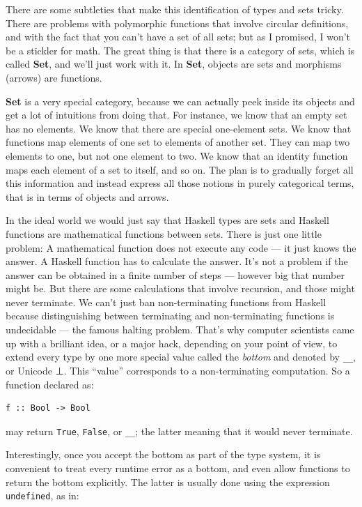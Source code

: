 There are some subtleties that make this identification of types and
sets tricky. There are problems with polymorphic functions that involve
circular definitions, and with the fact that you can't have a set of all
sets; but as I promised, I won't be a stickler for math. The great thing
is that there is a category of sets, which is called \textbf{Set}, and
we'll just work with it. In \textbf{Set}, objects are sets and morphisms
(arrows) are functions.

\textbf{Set} is a very special category, because we can actually peek
inside its objects and get a lot of intuitions from doing that. For
instance, we know that an empty set has no elements. We know that there
are special one-element sets. We know that functions map elements of one
set to elements of another set. They can map two elements to one, but
not one element to two. We know that an identity function maps each
element of a set to itself, and so on. The plan is to gradually forget
all this information and instead express all those notions in purely
categorical terms, that is in terms of objects and arrows.

In the ideal world we would just say that Haskell types are sets and
Haskell functions are mathematical functions between sets. There is just
one little problem: A mathematical function does not execute any code
--- it just knows the answer. A Haskell function has to calculate the
answer. It's not a problem if the answer can be obtained in a finite
number of steps --- however big that number might be. But there are some
calculations that involve recursion, and those might never terminate. We
can't just ban non-terminating functions from Haskell because
distinguishing between terminating and non-terminating functions is
undecidable --- the famous halting problem. That's why computer
scientists came up with a brilliant idea, or a major hack, depending on
your point of view, to extend every type by one more special value
called the \emph{bottom} and denoted by \texttt{\_\textbar{}\_}, or
Unicode ⊥. This ``value'' corresponds to a non-terminating computation.
So a function declared as:

\begin{verbatim}
f :: Bool -> Bool
\end{verbatim}

may return \texttt{True}, \texttt{False}, or \texttt{\_\textbar{}\_};
the latter meaning that it would never terminate.

Interestingly, once you accept the bottom as part of the type system, it
is convenient to treat every runtime error as a bottom, and even allow
functions to return the bottom explicitly. The latter is usually done
using the expression \texttt{undefined}, as in:


